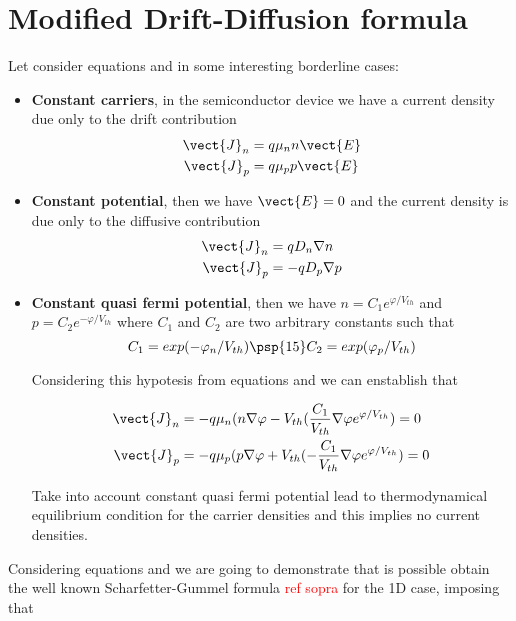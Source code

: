 \section{Modified Drift-Diffusion formula}

Let consider equations  and  in some interesting borderline cases:
\begin{itemize}
\item \textbf{Constant carriers}, in the semiconductor device we have  a current density due only to the drift contribution
\begin{align*}
\vect{J}_n & = q\mu_n n \vect{E} \\
\vect{J}_p & = q\mu_p p \vect{E}
\end{align*}
\item \textbf{Constant potential}, then we have $\vect{E}=0$ and the current density is due only to the diffusive contribution
\begin{align*}
\vect{J}_n & = qD_n\nabla n \\
\vect{J}_p & = -qD_p\nabla p
\end{align*}
\item \textbf{Constant quasi fermi potential}, then we have $n=C_1e^{\varphi / V_{th}}$ and $p=C_2e^{-\varphi / V_{th}}$ where $C_1$ and $C_2$ are two arbitrary constants such that
\begin{equation*}
C_1 = exp(-\varphi_n/V_{th}) \psp{15} C_2 = exp(\varphi_p/V_{th})
\end{equation*}

Considering this hypotesis from equations  and  we can enstablish that

\begin{align*}
\vect{J}_n & = -q\mu_n (n\nabla 	\varphi - V_{th} (\dfrac{C_1}{V_{th}}\nabla \varphi e^{\varphi / V_{th}}) = 0\\
\vect{J}_p & = -q\mu_p (p\nabla 	\varphi + V_{th} (-\dfrac{C_1}{V_{th}}\nabla \varphi e^{\varphi / V_{th}}) = 0
\end{align*}

Take into account constant quasi fermi potential lead to thermodynamical equilibrium condition for the carrier densities and this implies no current densities.
\end{itemize}

Considering equations  and  we are going to demonstrate that is possible obtain the well known Scharfetter-Gummel formula \textcolor{red}{ref sopra} for the 1D case, imposing that


